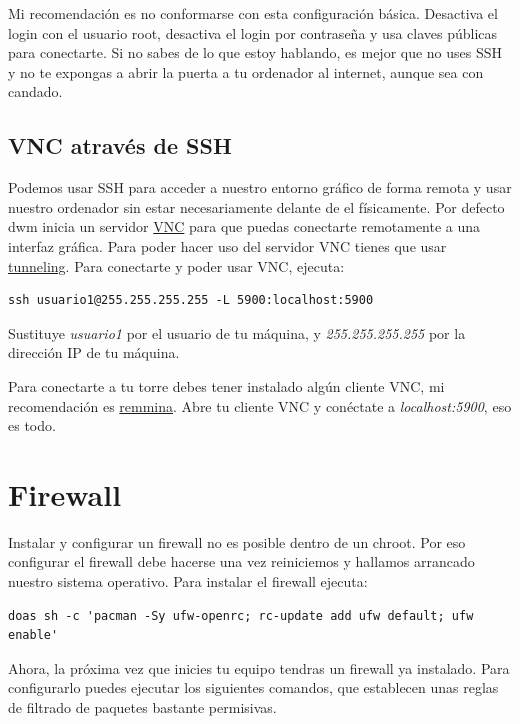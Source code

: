 \documentclass[12pt]{article}
\begin{document}
Mi recomendación es no conformarse con esta configuración básica. Desactiva el login con el usuario root, desactiva el login por contraseña y usa claves públicas para conectarte. Si no sabes de lo que estoy hablando, es mejor que no uses SSH y no te expongas a abrir la puerta a tu ordenador al internet, aunque sea con candado.

\subsection{VNC através de SSH}

Podemos usar SSH para acceder a nuestro entorno gráfico de forma remota y usar nuestro ordenador sin estar necesariamente delante de el físicamente. Por defecto dwm inicia un servidor \href{https://en.wikipedia.org/wiki/Virtual_Network_Computing}{VNC} para que puedas conectarte remotamente a una interfaz gráfica. Para poder hacer uso del servidor VNC tienes que usar \href{https://en.wikipedia.org/wiki/Tunneling_protocol}{tunneling}. Para conectarte y poder usar VNC, ejecuta:

\begin{verbatim}
ssh usuario1@255.255.255.255 -L 5900:localhost:5900
\end{verbatim}

Sustituye \emph{usuario1} por el usuario de tu máquina, y \emph{255.255.255.255} por la dirección IP de tu máquina.

Para conectarte a tu torre debes tener instalado algún cliente VNC, mi recomendación es \href{https://github.com/FreeRDP/Remmina}{remmina}. Abre tu cliente VNC y conéctate a \emph{localhost:5900}, eso es todo.

\section{Firewall}

Instalar y configurar un firewall no es posible dentro de un chroot. Por eso configurar el firewall debe hacerse una vez reiniciemos y hallamos arrancado nuestro sistema operativo. Para instalar el firewall ejecuta:

\begin{verbatim}
doas sh -c 'pacman -Sy ufw-openrc; rc-update add ufw default; ufw enable'
\end{verbatim}

Ahora, la próxima vez que inicies tu equipo tendras un firewall ya instalado. Para configurarlo puedes ejecutar los siguientes comandos, que establecen unas reglas de filtrado de paquetes bastante permisivas.
\end{document}
